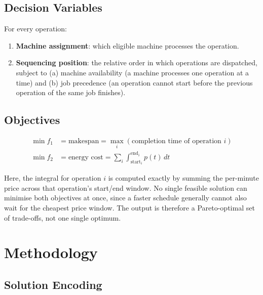 \documentclass[11pt,a4paper]{article}
\begin{document}
\subsection{Decision Variables}
\label{subsec:decision-variables}

For every operation:
\begin{enumerate}[label=\arabic*.]
    \item \textbf{Machine assignment}: which eligible machine processes the operation.
    \item \textbf{Sequencing position}: the relative order in which operations are dispatched,
    subject to (a) machine availability (a machine processes one operation at a time) and (b) job
    precedence (an operation cannot start before the previous operation of the same job finishes).
\end{enumerate}

\subsection{Objectives}
\label{subsec:objectives}

\begin{align}
    \min f_1 &= \text{makespan} = \max_{i} \left( \text{completion time of operation } i \right) \\
    \min f_2 &= \text{energy cost} = \sum_{i} \int_{\text{start}_i}^{\text{end}_i} p(t) \, dt
\end{align}

Here, the integral for operation $i$ is computed exactly by summing the per-minute price across that
operation's start/end window. No single feasible solution can minimise both objectives at once, since
a faster schedule generally cannot also wait for the cheapest price window. The output is therefore a
Pareto-optimal set of trade-offs, not one single optimum.

\section{Methodology}
\label{sec:methodology}

\subsection{Solution Encoding}
\label{subsec:solution-encoding}
\end{document}
